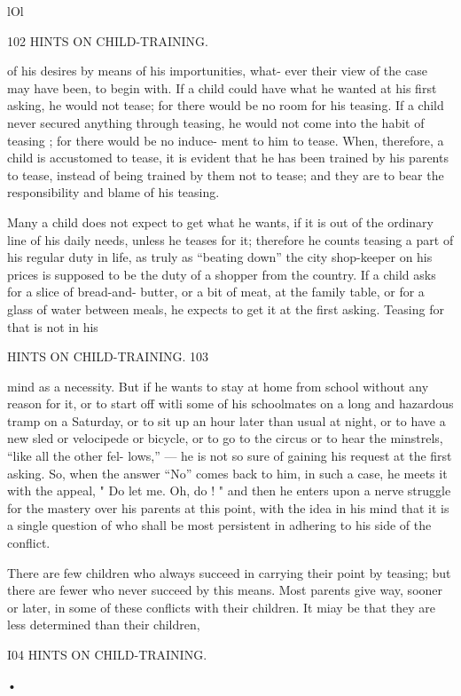 \documentclass[
]{book}
\begin{document}
lOl

102 HINTS ON CHILD-TRAINING.

of his desires by means of his importunities, what- ever their view of the case may have been, to begin with. If a child could have what he wanted at his first asking, he would not tease; for there would be no room for his teasing. If a child never secured anything through teasing, he would not come into the habit of teasing ; for there would be no induce- ment to him to tease. When, therefore, a child is accustomed to tease, it is evident that he has been trained by his parents to tease, instead of being trained by them not to tease; and they are to bear the responsibility and blame of his teasing.

Many a child does not expect to get what he wants, if it is out of the ordinary line of his daily needs, unless he teases for it; therefore he counts teasing a part of his regular duty in life, as truly as ``beating down'' the city shop-keeper on his prices is supposed to be the duty of a shopper from the country. If a child asks for a slice of bread-and- butter, or a bit of meat, at the family table, or for a glass of water between meals, he expects to get it at the first asking. Teasing for that is not in his

HINTS ON CHILD-TRAINING. 103

mind as a necessity. But if he wants to stay at home from school without any reason for it, or to start off witli some of his schoolmates on a long and hazardous tramp on a Saturday, or to sit up an hour later than usual at night, or to have a new sled or velocipede or bicycle, or to go to the circus or to hear the minstrels, ``like all the other fel- lows,'' --- he is not so sure of gaining his request at the first asking. So, when the answer ``No'' comes back to him, in such a case, he meets it with the appeal, " Do let me. Oh, do ! " and then he enters upon a nerve struggle for the mastery over his parents at this point, with the idea in his mind that it is a single question of who shall be most persistent in adhering to his side of the conflict.

There are few children who always succeed in carrying their point by teasing; but there are fewer who never succeed by this means. Most parents give way, sooner or later, in some of these conflicts with their children. It miay be that they are less determined than their children,

I04 HINTS ON CHILD-TRAINING.

•
\end{document}
